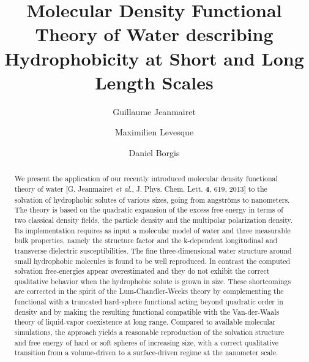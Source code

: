 \documentclass[aip,jcp,preprint]{revtex4-1}
\begin{document}
\title{Molecular Density Functional Theory of Water describing Hydrophobicity at Short and Long Length Scales}



\author{Guillaume Jeanmairet}

\author{Maximilien Levesque}

\author{Daniel Borgis}


\begin{abstract}
We present the application of our recently introduced  molecular density functional theory  of water [G. Jeanmairet {\em et al.}, J. Phys. Chem. Lett. {\bf 4}, 619, 2013] to the solvation of hydrophobic solutes of various sizes, going from angstr\"{o}ms to nanometers. The theory  is based on the quadratic expansion of the excess free energy in terms of two classical density fields, the particle density and the multipolar polarization density. Its implementation requires as input a molecular model of  water and  three measurable bulk properties, namely the structure factor and the k-dependent longitudinal and transverse dielectric susceptibilities. The fine  three-dimensional water structure around small hydrophobic molecules is found to be well reproduced. In contrast the  computed solvation free-energies appear overestimated and  they do not exhibit the correct qualitative behavior when the hydrophobic solute is grown in size.  These shortcomings are corrected in the spirit of the Lum-Chandler-Weeks theory by complementing the functional with a truncated hard-sphere functional acting beyond quadratic order in density and  by making the resulting functional compatible with the Van-der-Waals theory of liquid-vapor coexistence at long range. Compared to available molecular simulations, the approach yields a reasonable reproduction of the solvation structure and free energy of  hard or soft spheres of increasing size, with a correct qualitative transition from a volume-driven to a surface-driven regime at the nanometer scale.
\end{abstract}


\maketitle
\end{document}

